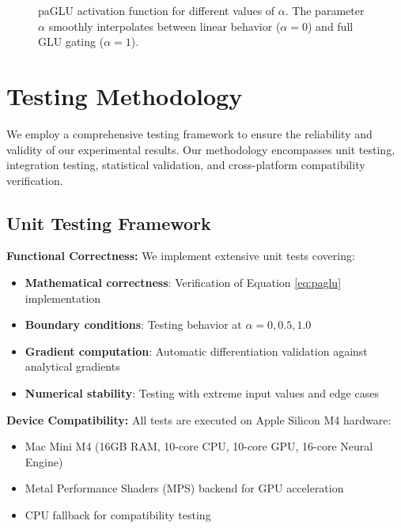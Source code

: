 \documentclass[11pt]{article}
\begin{document}
\begin{figure}[ht]
\centering
{}
\caption{paGLU activation function for different values of $\alpha$. The parameter $\alpha$ smoothly interpolates between linear behavior ($\alpha=0$) and full GLU gating ($\alpha=1$).}
\label{fig:paglu_curves}
\end{figure}

\section{Testing Methodology}
\label{sec:testing}

We employ a comprehensive testing framework to ensure the reliability and validity of our experimental results. Our methodology encompasses unit testing, integration testing, statistical validation, and cross-platform compatibility verification.

\subsection{Unit Testing Framework}

\textbf{Functional Correctness:} We implement extensive unit tests covering:
\begin{itemize}
    \item \textbf{Mathematical correctness}: Verification of Equation \ref{eq:paglu} implementation
    \item \textbf{Boundary conditions}: Testing behavior at $\alpha = 0, 0.5, 1.0$
    \item \textbf{Gradient computation}: Automatic differentiation validation against analytical gradients
    \item \textbf{Numerical stability}: Testing with extreme input values and edge cases
\end{itemize}

\textbf{Device Compatibility:} All tests are executed on Apple Silicon M4 hardware:
\begin{itemize}
    \item Mac Mini M4 (16GB RAM, 10-core CPU, 10-core GPU, 16-core Neural Engine)
    \item Metal Performance Shaders (MPS) backend for GPU acceleration
    \item CPU fallback for compatibility testing
\end{itemize}
\end{document}
